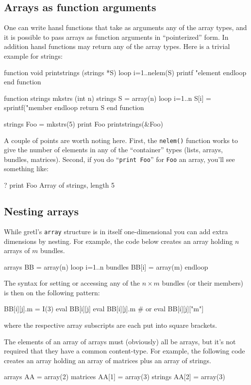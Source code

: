 \subsection{Arrays as function arguments}
\label{subsec:array-args}

One can write hansl functions that take as arguments any of the array
types, and it is possible to pass arrays as function arguments in
``pointerized'' form. In addition hansl functions may return any of
the array types. Here is a trivial example for strings:
\begin{code}
function void printstrings (strings *S)
  loop i=1..nelem(S)
    printf "element %
  endloop
end function

function strings mkstrs (int n)
  strings S = array(n)
  loop i=1..n
    S[i] = sprintf("member %
  endloop
  return S
end function

strings Foo = mkstrs(5)
print Foo
printstrings(&Foo)
\end{code}

A couple of points are worth noting here. First, the \texttt{nelem()}
function works to give the number of elements in any of the
``container'' types (lists, arrays, bundles, matrices). Second, if you
do ``\texttt{print Foo}'' for \texttt{Foo} an array, you'll see
something like:
\begin{code}
? print Foo
Array of strings, length 5
\end{code}

\subsection{Nesting arrays}

While gretl's \texttt{array} structure is in itself one-dimensional
you can add extra dimensions by nesting. For example, the code below
creates an array holding $n$ arrays of $m$ bundles.
\begin{code}
arrays BB = array(n)
loop i=1..n
    bundles BB[i] = array(m)
endloop
\end{code}
The syntax for setting or accessing any of the $n \times m$ bundles
(or their members) is then on the following pattern:
\begin{code}
BB[i][j].m = I(3)
eval BB[i][j]
eval BB[i][j].m # or eval BB[i][j]["m"]
\end{code}
where the respective array subscripts are each put into square
brackets.

The elements of an array of arrays must (obviously) all be arrays, but
it's not required that they have a common content-type. For example,
the following code creates an array holding an array of matrices plus
an array of strings.
\begin{code}
arrays AA = array(2)
matrices AA[1] = array(3)
strings AA[2] = array(3)
\end{code}

